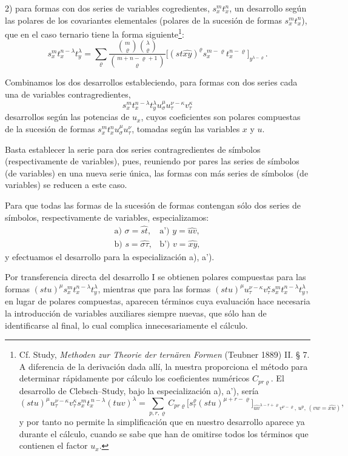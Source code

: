 \documentclass[11pt]{article}
\begin{document}
2) para formas con dos series de variables cogredientes, $s_x^m t_x^n$, un desarrollo según las polares de los covariantes elementales (polares de la sucesión de formas $s_x^m t_x^n$), que en el caso ternario tiene la forma siguiente\footnote{Cf. Study, \emph{Methoden zur Theorie der ternären Formen} (Teubner 1889) II. § 7. A diferencia de la derivación dada allí, la nuestra proporciona el método para determinar rápidamente por cálculo los coeficientes numéricos $C_{pr\varrho}$. El desarrollo de Clebsch--Study, bajo la especialización a), a'), sería
\[
(stu)^\mu u_\tau^{\nu-\kappa}v_\tau^\kappa s_x^m t_x^{\,n-\lambda}(tuv)^\lambda
=\sum_{p,r,\varrho} C_{pr\varrho}
\bigl[s_\tau^\varrho(stu)^{\mu+r-\varrho}\bigr]_{\widehat{uv}^{\lambda-r+\varrho}v^{\nu-\varrho},\,u^p,\,(vw=\widehat{xw})},
\]
y por tanto no permite la simplificación que en nuestro desarrollo aparece ya durante el cálculo, cuando se sabe que han de omitirse todos los términos que contienen el factor $u_x$.}:
\[
\tag{I}
s_x^m t_x^{n-\lambda}t_y^\lambda
=\sum_{\varrho}
\frac{\binom{m}{\varrho}\binom{\lambda}{\varrho}}
{\binom{m+n-\varrho+1}{\varrho}}
\bigl[(st\widehat{xy})^\varrho s_x^{m-\varrho}t_x^{n-\varrho}\bigr]_{y^{\lambda-\varrho}}.
\]

Combinamos los dos desarrollos estableciendo, para formas con dos series cada una de variables contragredientes,
\[
s_x^m t_x^{n-\lambda}t_y^\lambda u_\sigma^\mu u_\tau^{\nu-\kappa}v_\tau^\kappa
\]
desarrollos según las potencias de $u_x$, cuyos coeficientes son polares compuestas de la sucesión de formas $s_x^m t_x^n u_\sigma^\mu u_\tau^\nu$, tomadas según las variables $x$ y $u$.

Basta establecer la serie para dos series contragredientes de símbolos (respectivamente de variables), pues, reuniendo por pares las series de símbolos (de variables) en una nueva serie única, las formas con más series de símbolos (de variables) se reducen a este caso.

Para que todas las formas de la sucesión de formas contengan sólo dos series de símbolos, respectivamente de variables, especializamos:
\[
\begin{array}{ll}
\text{a) } \sigma=\widehat{st}, & \text{a') } y=\widehat{uv},\\[0.3em]
\text{b) } s=\widehat{\sigma\tau}, & \text{b') } v=\widehat{xy},
\end{array}
\]
y efectuamos el desarrollo para la especialización a), a').

Por transferencia directa del desarrollo I se obtienen polares compuestas para las formas $(stu)^\mu s_x^m t_x^{n-\lambda}t_y^\lambda$, mientras que para las formas $(stu)^\mu u_\tau^{\nu-\kappa}v_\tau^\kappa s_x^m t_x^{n-\lambda}t_y^\lambda$, en lugar de polares compuestas, aparecen términos cuya evaluación hace necesaria la introducción de variables auxiliares siempre nuevas, que sólo han de identificarse al final, lo cual complica innecesariamente el cálculo.
\end{document}
